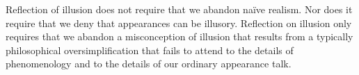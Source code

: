 \documentclass[12pt]{article}
\begin{document}
Reflection of illusion does not require that we abandon naïve realism. Nor does it require that we deny that appearances can be illusory. Reflection on illusion only requires that we abandon a misconception of illusion that results from a typically philosophical oversimplification that fails to attend to the details of phenomenology and to the details of our ordinary appearance talk.


 
 
\end{document}
